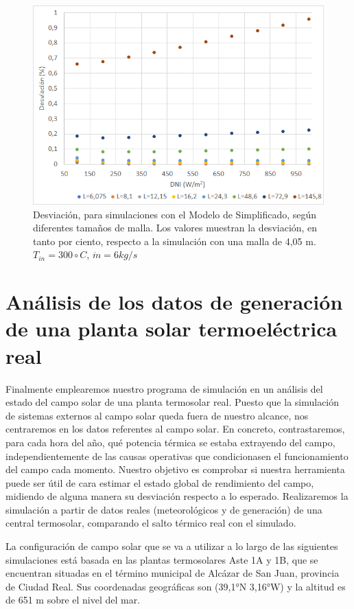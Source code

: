 \begin{figure}[h!]
\includegraphics[width=0.9\linewidth]{images/desviacionmodelsimplificadomalla.png}
\caption{Desviación, para simulaciones con el Modelo de Simplificado, según diferentes tamaños de malla. Los valores muestran la desviación, en tanto por ciento, respecto a la simulación con una malla de 4,05 m. $T_{in}=300 \circ C$, $\dot m = 6 kg/s$} 
\label{fig:desviacionmodelsimplificado}
\end{figure}



\section{Análisis de los datos de generación de una planta solar termoeléctrica real}
\label{descripcion-central}

Finalmente emplearemos nuestro programa de simulación en un análisis del estado del campo solar de una planta termosolar real. Puesto que la simulación de sistemas externos al campo solar queda fuera de nuestro alcance, nos centraremos en los datos referentes al campo solar. En concreto, contrastaremos, para cada  hora del año, qué potencia térmica se estaba extrayendo del campo, independientemente de las causas operativas que condicionasen el funcionamiento del campo cada momento. Nuestro objetivo es comprobar si nuestra herramienta puede ser útil de cara estimar el estado global de rendimiento del campo, midiendo de alguna manera su desviación respecto a lo esperado. Realizaremos la simulación a partir de datos reales (meteorológicos y de generación) de una central termosolar, comparando el salto térmico real con el simulado. 

La configuración de campo solar que se va a utilizar a lo largo de las siguientes simulaciones está basada en las plantas termosolares Aste 1A y 1B, que se encuentran situadas en el término municipal de Alcázar de San Juan, provincia de Ciudad Real. Sus coordenadas geográficas son (39,1°N 3,16°W) y la altitud es de 651 m sobre el nivel del mar.

